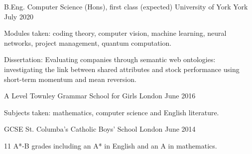 
\begin{cventries}
  \cventry
    {B.Eng. Computer Science (Hons), first class (expected)} %
    {University of York} %
    {York} %
    {July 2020} %
    {
      \begin{cvitems} %
         \item {Modules taken: coding theory, computer vision, machine learning, neural networks, project management, quantum computation.}
         \vspace{0.5mm}
         \item {Dissertation: Evaluating companies through semantic web ontologies: investigating the link between shared attributes and stock performance using short-term momentum and mean reversion.}
      \end{cvitems}
    }

  \cventry
    {A Level} %
    {Townley Grammar School for Girls} %
    {London} %
    {June 2016} %
    {
      \begin{cvitems} %
      \item {Subjects taken: mathematics, computer science and English literature.}
      \end{cvitems}
    }

  \cventry
    {GCSE} %
    {St. Columba’s Catholic Boys' School} %
    {London} %
    {June 2014} %
    {
      \begin{cvitems} %
      \item {11 A*-B grades including an A* in English and an A in mathematics.}
      \end{cvitems}
    }
\end{cventries}
